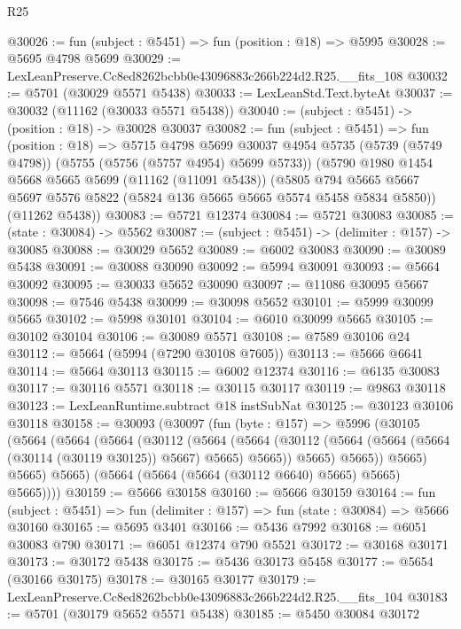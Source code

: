 \begin{lexlean}{R25}
\begin{coremodule}
@30026 := fun (subject : @5451) => fun (position : @18) => @5995
@30028 := @5695 @4798 @5699
@30029 := LexLeanPreserve.Cc8ed8262bcbb0e43096883c266b224d2.R25.__fits_108
@30032 := @5701 (@30029 @5571 @5438)
@30033 := LexLeanStd.Text.byteAt
@30037 := @30032 (@11162 (@30033 @5571 @5438))
@30040 := (subject : @5451) -> (position : @18) -> @30028 @30037
@30082 := fun (subject : @5451) =>
  fun (position : @18) =>
  @5715
    @4798
    @5699
    @30037
    @4954
    @5735
    (@5739 (@5749 @4798))
    (@5755 (@5756 (@5757 @4954) @5699 @5733))
    (@5790
      @1980
      @1454
      @5668
      @5665
      @5699
      (@11162 (@11091 @5438))
      (@5805 @794 @5665 @5667 @5697 @5576 @5822 (@5824 @136 @5665 @5665 @5574 @5458 @5834 @5850))
      (@11262 @5438))
@30083 := @5721 @12374
@30084 := @5721 @30083
@30085 := (state : @30084) -> @5562
@30087 := (subject : @5451) -> (delimiter : @157) -> @30085
@30088 := @30029 @5652
@30089 := @6002 @30083
@30090 := @30089 @5438
@30091 := @30088 @30090
@30092 := @5994 @30091
@30093 := @5664 @30092
@30095 := @30033 @5652 @30090
@30097 := @11086 @30095 @5667
@30098 := @7546 @5438
@30099 := @30098 @5652
@30101 := @5999 @30099 @5665
@30102 := @5998 @30101
@30104 := @6010 @30099 @5665
@30105 := @30102 @30104
@30106 := @30089 @5571
@30108 := @7589 @30106 @24
@30112 := @5664 (@5994 (@7290 @30108 @7605))
@30113 := @5666 @6641
@30114 := @5664 @30113
@30115 := @6002 @12374
@30116 := @6135 @30083
@30117 := @30116 @5571
@30118 := @30115 @30117
@30119 := @9863 @30118
@30123 := LexLeanRuntime.subtract @18 instSubNat
@30125 := @30123 @30106 @30118
@30158 := @30093
    (@30097
      (fun (byte : @157) =>
      @5996
        (@30105
          (@5664
            (@5664
              (@5664
                (@30112
                  (@5664
                    (@5664
                      (@30112 (@5664 (@5664 (@5664 (@30114 (@30119 @30125)) @5667) @5665) @5665))
                      @5665)
                    @5665))
                @5665)
              @5665)
            @5665)
          (@5664 (@5664 (@5664 (@30112 @6640) @5665) @5665) @5665))))
@30159 := @5666 @30158
@30160 := @5666 @30159
@30164 := fun (subject : @5451) => fun (delimiter : @157) => fun (state : @30084) => @5666 @30160
@30165 := @5695 @3401
@30166 := @5436 @7992
@30168 := @6051 @30083 @790
@30171 := @6051 @12374 @790 @5521
@30172 := @30168 @30171
@30173 := @30172 @5438
@30175 := @5436 @30173 @5458
@30177 := @5654 (@30166 @30175)
@30178 := @30165 @30177
@30179 := LexLeanPreserve.Cc8ed8262bcbb0e43096883c266b224d2.R25.__fits_104
@30183 := @5701 (@30179 @5652 @5571 @5438)
@30185 := @5450 @30084 @30172

\end{coremodule}
\end{lexlean}
